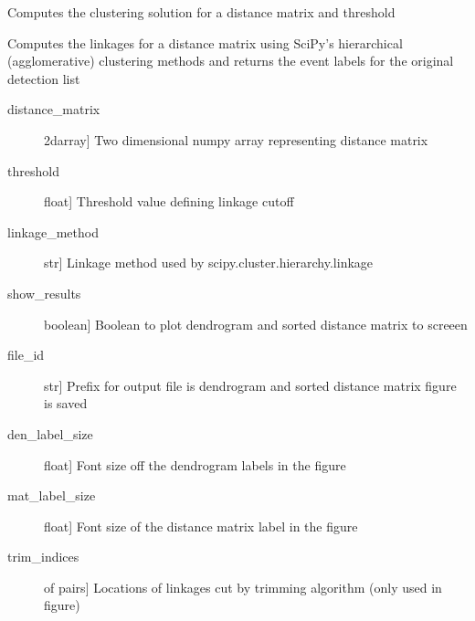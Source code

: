\documentclass[letterpaper,10pt,english]{sphinxmanual}
\begin{document}

\begin{fulllineitems}
\label{\detokenize{infrapy.association:infrapy.association.hjl.cluster}}
Computes the clustering solution for a distance matrix and threshold

Computes the linkages for a distance matrix using SciPy’s hierarchical (agglomerative) clustering
methods and returns the event labels for the original detection list
\begin{description}
\item[{distance\_matrix}] \leavevmode{[}2darray{]}
Two dimensional numpy array representing distance matrix

\item[{threshold}] \leavevmode{[}float{]}
Threshold value defining linkage cutoff

\item[{linkage\_method}] \leavevmode{[}str{]}
Linkage method used by scipy.cluster.hierarchy.linkage

\item[{show\_results}] \leavevmode{[}boolean{]}
Boolean to plot dendrogram and sorted distance matrix to screeen

\item[{file\_id}] \leavevmode{[}str{]}
Prefix for output file is dendrogram and sorted distance matrix figure is saved

\item[{den\_label\_size}] \leavevmode{[}float{]}
Font size off the dendrogram labels in the figure

\item[{mat\_label\_size}] \leavevmode{[}float{]}
Font size of the distance matrix label in the figure

\item[{trim\_indices}] \leavevmode{[} of  pairs{]}
Locations of linkages cut by trimming algorithm (only used in figure)

\end{description}


\end{fulllineitems}
\end{document}
